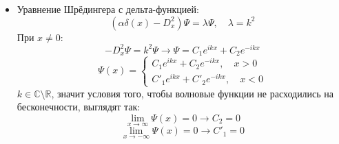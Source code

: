 \documentclass[12pt]{article}
\theoremstyle{definition}
\begin{document}
\begin{itemize}
\begin{enumerate}
\begin{equation}
        \begin{array}{l}
        -\alpha,\quad x\geq 0\\
        -\alpha,\quad x<0
        \end{array}
        \right.=-\alpha
        \end{equation}
        \begin{equation}
            -\frac{W(\varphi_1,\Psi_2)}{2ik}=-\frac{i\alpha}{2k}=b(k)
        \end{equation}
        \item 
        \begin{equation}
            1-\frac{1}{2ik}\int\limits_{-\infty}^\infty e^{iky}\alpha\delta(y)\varphi_1(y,k)dy=1-\frac{\alpha}{2ik}\varphi_1(0,k)=1+\frac{i\alpha}{2k}=a(k)
        \end{equation}
        \begin{equation}
            \frac{1}{2ik}\int\limits_{-\infty}^\infty e^{-2ik}\alpha\delta(x)\varphi_1(x,k)dx=\frac{\alpha}{2ik}\varphi_1(0,k)=-\frac{i\alpha}{2k}=b(k)
        \end{equation}
        \item $a=1+\frac{i\alpha}{2k}=1+O(\frac{1}{k})$.
    \end{enumerate}
    \item[\textbf{ДЗ 6-2.}]
    Уравнение Шрёдингера с дельта-функцией:
    \begin{equation}
        (\alpha\delta(x)-D_x^2)\Psi=\lambda\Psi,\quad \lambda=k^2
    \end{equation}
    При $x\neq 0$:
    \begin{equation}
        -D_x^2\Psi=k^2\Psi\rightarrow \Psi=C_1e^{ikx}+C_2e^{-ikx}
    \end{equation}
    \begin{equation}
        \Psi(x)=\left\{
        \begin{array}{l}
        C_1e^{ikx}+C_2e^{-ikx},\quad x>0\\
        C'_1e^{ikx}+C'_2e^{-ikx},\quad x<0
        \end{array}
        \right.
    \end{equation}
    $k\in\mathbb{C}\setminus \mathbb{R}$, значит условия того, чтобы волновые функции не расходились на бесконечности, выглядят так:
    \begin{equation}
        \lim\limits_{x\rightarrow\infty}\Psi(x)=0\rightarrow C_2=0
    \end{equation}
    \begin{equation}
        \lim\limits_{x\rightarrow-\infty}\Psi(x)=0\rightarrow C'_1=0

\end{equation}
\end{itemize}
\end{document}
